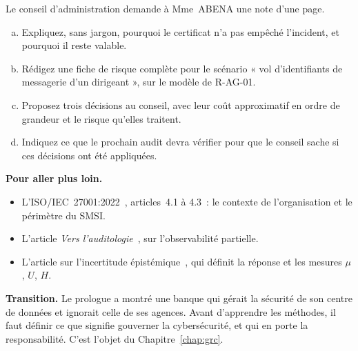 \begin{boxexo}[title={\ding{45}\quad Exercice~P.4. La note au conseil d'administration \niveauexpert}]
Le conseil d'administration demande à Mme~ABENA une note d'une page.
\begin{enumerate}[(a)]
    \item Expliquez, sans jargon, pourquoi le certificat n'a pas empêché
          l'incident, et pourquoi il reste valable.
    \item Rédigez une fiche de risque complète pour le scénario « vol
          d'identifiants de messagerie d'un dirigeant », sur le modèle de
          R-AG-01.
    \item Proposez trois décisions au conseil, avec leur coût approximatif
          en ordre de grandeur et le risque qu'elles traitent.
    \item Indiquez ce que le prochain audit devra vérifier pour que le
          conseil sache si ces décisions ont été appliquées.
\end{enumerate}
\end{boxexo}

\bigskip

\begin{boxinfo}
\textbf{Pour aller plus loin.}
\begin{itemize}
    \item L'ISO/IEC~27001:2022~\cite{iso27001_2022}, articles~4.1 à 4.3~:
          le contexte de l'organisation et le périmètre du SMSI.
    \item L'article \emph{Vers l'auditologie}~\cite{minka2026auditologie},
          sur l'observabilité partielle.
    \item L'article sur l'incertitude épistémique~\cite{minka2026nek}, qui
          définit la réponse \NEK{} et les mesures $\mu$, $U$, $H$.
\end{itemize}
\end{boxinfo}

\begin{boxinfo}
\textbf{Transition.} Le prologue a montré une banque qui gérait la sécurité
de son centre de données et ignorait celle de ses agences. Avant d'apprendre
les méthodes, il faut définir ce que signifie gouverner la cybersécurité, et
qui en porte la responsabilité. C'est l'objet du Chapitre~\ref{chap:grc}.
\end{boxinfo}
